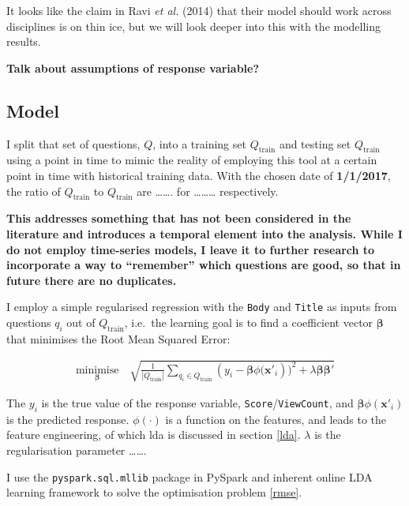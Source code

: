 \documentclass[11pt,preprint, authoryear]{article}
\numberwithin{equation}{section}
\numberwithin{figure}{section}
\begin{document}
It looks like the claim in Ravi \emph{et al.} (2014) that their model
should work across disciplines is on thin ice, but we will look deeper
into this with the modelling results.

\textbf{Talk about assumptions of response variable?}

\subsection{\texorpdfstring{Model \label{Model}}{Model }}\label{model}

\color{black}

I split that set of questions, \(Q\), into a training set
\(Q_\text{train}\) and testing set \(Q_\text{train}\) using a point in
time to mimic the reality of employing this tool at a certain point in
time with historical training data. With the chosen date of
\textbf{1/1/2017}, the ratio of \(Q_\text{train}\) to \(Q_\text{train}\)
are \ldots{}\ldots{}. for \ldots{}\ldots{}\ldots{} respectively.

\textbf{This addresses something that has not been considered in the
literature and introduces a temporal element into the analysis. While I
do not employ time-series models, I leave it to further research to
incorporate a way to ``remember'' which questions are good, so that in
future there are no duplicates.}

I employ a simple regularised regression with the \texttt{Body} and
\texttt{Title} as inputs from questions \(q_i\) out of
\(Q_\text{train}\), i.e.~the learning goal is to find a coefficient
vector \(\bm{\beta}\) that minimises the Root Mean Squared Error:

\begin{align} \label{rmse}
\underset{\bm{\beta}}{\text{minimise}} \quad \sqrt{ \frac{1}{|Q_\text{train}|} \sum_{ q_{i} \in Q_{\text{train}} } ( y_i - {\bm{\beta}\phi(\bm{x'}_i}) )^2 + \lambda \bm{\beta}\bm{\beta'} }
\end{align}

The \(y_i\) is the true value of the response variable,
\texttt{Score}/\texttt{ViewCount}, and \(\bm{\beta}\phi(\bm{x'}_i)\) is
the predicted response. \(\phi(\cdot)\) is a function on the features,
and leads to the feature engineering, of which lda is discussed in
section \ref{lda}. \(\lambda\) is the regularisation parameter
\ldots{}\ldots{}.

I use the \texttt{pyspark.sql.mllib} package in PySpark and inherent
online LDA learning framework to solve the optimisation problem
\ref{rmse}.
\end{document}

